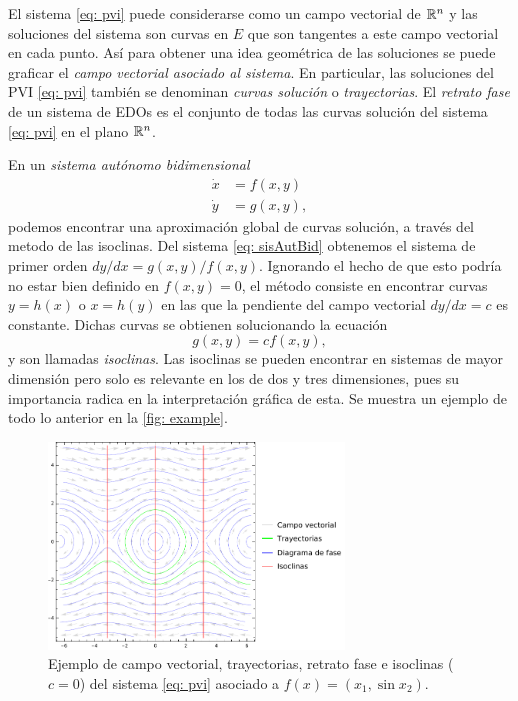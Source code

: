     El sistema \eqref{eq: pvi} puede considerarse como un campo vectorial de ${\mathbb{R}}^{n}$ y las soluciones del sistema son curvas en $E$ que son tangentes a este campo vectorial en cada punto. Así para obtener una idea geométrica de las soluciones se puede graficar el \textit{campo vectorial asociado al sistema}. En particular, las soluciones del PVI \eqref{eq: pvi} también se denominan \textit{curvas solución} o \textit{trayectorias}.
   El \textit{retrato fase} de un sistema de EDOs es el conjunto de todas las curvas solución del sistema \eqref{eq: pvi} en el plano ${\mathbb{R}}^{n}$.
   
   En un \textit{sistema autónomo bidimensional}
   \begin{equation}
   	\begin{aligned}
   		\dot{x} &= f(x, y) \\
   		\dot{y} &= g(x, y),
   	\end{aligned}
   	\label{eq: sisAutBid}
   \end{equation}
   podemos encontrar una aproximación global de curvas solución, a través del metodo de las isoclinas. Del sistema \eqref{eq: sisAutBid} obtenemos el sistema de primer orden $dy/dx = g(x, y)/f(x, y)$. Ignorando el hecho de que esto podría no estar bien definido en $f(x, y) = 0$, el método consiste en encontrar curvas $y=h(x)$ o $x=h(y)$ en las que la pendiente del campo vectorial $dy/dx = c$ es constante. Dichas curvas se obtienen solucionando la ecuación
   \begin{equation}
    g(x, y) = cf(x, y),
    \label{eq: pendiente}
   \end{equation} 
   y son llamadas \textit{isoclinas}. Las isoclinas se pueden encontrar en sistemas de mayor dimensión pero solo es relevante en los de dos y tres dimensiones, pues su importancia radica en la interpretación gráfica de esta. Se muestra un ejemplo de todo lo anterior en la \autoref{fig: example}.
   \begin{figure}
   	\centering
   	\includegraphics[width=0.7\textwidth]{img/Example.pdf}
   	\caption{Ejemplo de campo vectorial, trayectorias, retrato fase e isoclinas ($c=0$) del sistema \eqref{eq: pvi} asociado a $f(x)=(x_{1},\sin{x_{2}})$.}
   	\label{fig: example}
   \end{figure}
   
